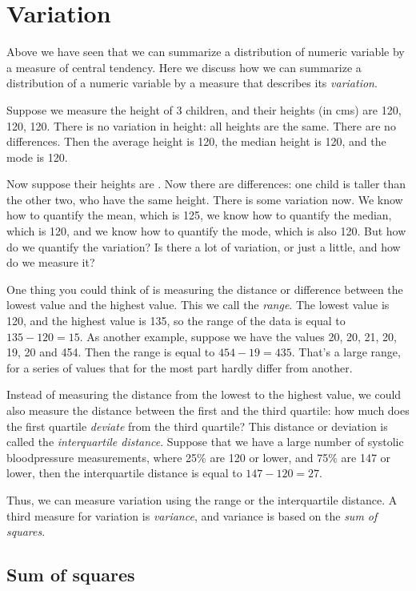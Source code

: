 \documentclass[]{report}\usepackage[]{graphicx}\usepackage[]{color}
\begin{document}
\section{Variation}

Above we have seen that we can summarize a distribution of numeric variable by a measure of central tendency. Here we discuss how we can summarize a distribution of a numeric variable by a measure that describes its \textit{variation}.

Suppose we measure the height of 3 children, and their heights (in cms) are 120, 120, 120. There is no variation in height: all heights are the same. There are no differences. Then the average height is 120, the median height is 120, and the mode is 120.

Now suppose their heights are . Now there are differences: one child is taller than the other two, who have the same height. There is some variation now. We know how to quantify the mean, which is 125, we know how to quantify the median, which is 120, and we know how to quantify the mode, which is also 120. But how do we quantify the variation? Is there a lot of variation, or just a little, and how do we measure it?

One thing you could think of is measuring the distance or difference between the lowest value and the highest value. This we call the \textit{range}. The lowest value is 120, and the highest value is 135, so the range of the data is equal to $135-120=15$. As another example, suppose we have the values 20, 20, 21, 20, 19, 20 and 454. Then the range is equal to $454-19=435$. That's a large range, for a series of values that for the most part hardly differ from another.

Instead of measuring the distance from the lowest to the highest value, we could also measure the distance between the first and the third quartile: how much does the first quartile \textit{deviate} from the third quartile? This distance or deviation is called the \textit{interquartile distance}. Suppose that we have a large number of systolic bloodpressure measurements, where 25\% are 120 or lower, and 75\% are 147 or lower, then the interquartile distance is equal to $147-120=27$.

Thus, we can measure variation using the range or the interquartile distance. A third measure for variation is \textit{variance}, and variance is based on the \textit{sum of squares}.

\subsection{Sum of squares}
\end{document}
